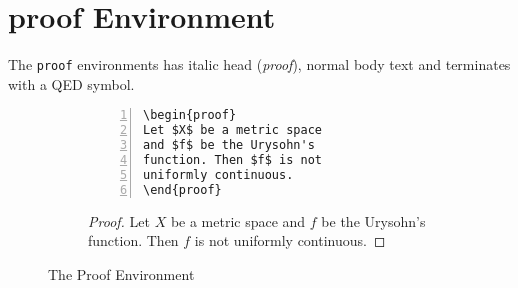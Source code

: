 \documentclass{article}
\theoremstyle{definition}
\theoremstyle{remark}
\begin{document}
\section{proof Environment}
	The \texttt{proof} environments has italic head (\textit{proof}), normal body text and terminates with a QED symbol.
\begin{figure}[h]
\centering
\begin{subfigure}{0.45\textwidth}
\begin{Verbatim}[numbers = left]
\begin{proof}
Let $X$ be a metric space
and $f$ be the Urysohn's
function. Then $f$ is not
uniformly continuous.
\end{proof}
\end{Verbatim}
\end{subfigure}
\begin{subfigure}{0.45\textwidth}
\begin{proof}
Let $X$ be a metric space
and $f$ be the Urysohn's
function. Then $f$ is not
uniformly continuous.
\end{proof}
\end{subfigure} 
\caption{The Proof Environment}
\label{fig:proof}
\end{figure}

\end{document}
